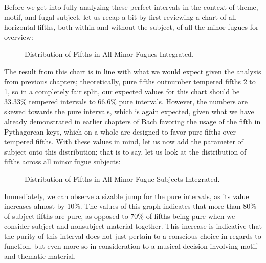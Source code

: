 Before we get into fully analyzing these perfect intervals in the
context of theme, motif, and fugal subject, let us recap a bit by first
reviewing a chart of all horizontal fifths, both within and without the
subject, of all the minor fugues for overview:




\begin{figure}[H]
\vspace{1.5em}
    \centering
    \caption{Distribution of Fifths in All Minor Fugues Integrated. }
\end{figure}    The result from this chart is in line with what we would expect given
the analysis from previous chapters; theoretically, pure fifths
outnumber tempered fifths 2 to 1, so in a completely fair split, our
expected values for this chart should be 33.33\% tempered intervals to
66.6\% pure intervals. However, the numbers are skewed towards the pure
intervals, which is again expected, given what we have already
demonstrated in earlier chapters of Bach favoring the usage of the fifth
in Pythagorean keys, which on a whole are designed to favor pure fifths
over tempered fifths. With these values in mind, let us now add the
parameter of subject onto this distribution; that is to say, let us look
at the distribution of fifths across all minor fugue subjects:




\begin{figure}[H]
\vspace{1.5em}
    \centering
    \caption{Distribution of Fifths in All Minor Fugue Subjects Integrated. }
\end{figure}    Immediately, we can observe a sizable jump for the pure intervals, as
its value increases almost by 10\%. The values of this graph indicates
that more than 80\% of subject fifths are pure, as opposed to 70\% of
fifths being pure when we consider subject and nonsubject material
together. This increase is indicative that the purity of this interval
does not just pertain to a conscious choice in regards to function, but
even more so in consideration to a musical decision involving motif and
thematic material.

